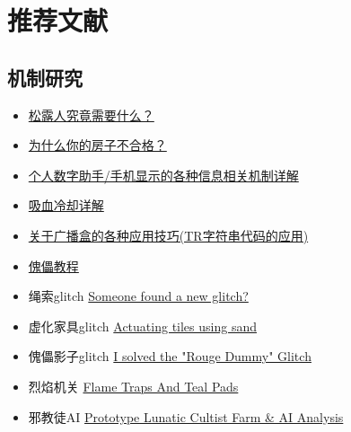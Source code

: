 \chapter{推荐文献}

\section{机制研究}
\begin{itemize}
\item \href{https://www.bbstr.net/threads/469/}{松露人究竟需要什么？}
\item \href{https://www.bbstr.net/threads/463/}{为什么你的房子不合格？} 
\item \href{https://www.bbstr.net/threads/133/}{个人数字助手/手机显示的各种信息相关机制详解}
\item \href{https://www.bbstr.net/threads/lifesteal.198/}{吸血冷却详解}
\item \href{https://www.bbstr.net/threads/tr.127/}{关于广播盒的各种应用技巧(TR字符串代码的应用)}
\item \href{https://www.bilibili.com/read/cv2156999}{傀儡教程}
\item 绳索glitch \href{https://forums.terraria.org/index.php?threads/someone-found-a-new-glitch.75822/}{Someone found a new glitch?}
\item 虚化家具glitch \href{https://forums.terraria.org/index.php?threads/actuating-tiles-using-sand.75811/}{Actuating tiles using sand}
\item 傀儡影子glitch \href{https://forums.terraria.org/index.php?threads/i-solved-the-rouge-dummy-glitch.76951/}{I solved the "Rouge Dummy" Glitch}
\item 烈焰机关 \href{https://forums.terraria.org/index.php?threads/flame-traps-and-teal-pads.76835/}{Flame Traps And Teal Pads}
\item 邪教徒AI \href{https://forums.terraria.org/index.php?threads/prototype-lunatic-cultist-farm-ai-analysis.77022/}{Prototype Lunatic Cultist Farm \& AI Analysis}
\end{itemize}

